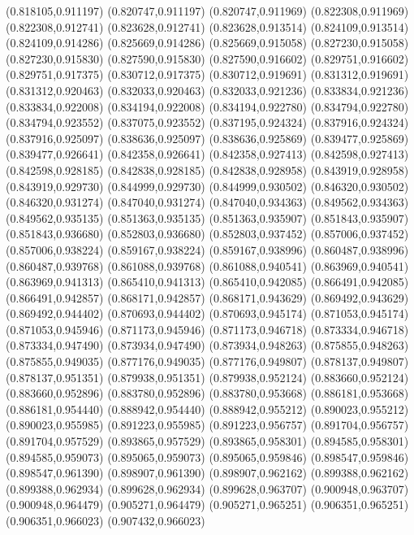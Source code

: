 (0.818105,0.911197)
(0.820747,0.911197)
(0.820747,0.911969)
(0.822308,0.911969)
(0.822308,0.912741)
(0.823628,0.912741)
(0.823628,0.913514)
(0.824109,0.913514)
(0.824109,0.914286)
(0.825669,0.914286)
(0.825669,0.915058)
(0.827230,0.915058)
(0.827230,0.915830)
(0.827590,0.915830)
(0.827590,0.916602)
(0.829751,0.916602)
(0.829751,0.917375)
(0.830712,0.917375)
(0.830712,0.919691)
(0.831312,0.919691)
(0.831312,0.920463)
(0.832033,0.920463)
(0.832033,0.921236)
(0.833834,0.921236)
(0.833834,0.922008)
(0.834194,0.922008)
(0.834194,0.922780)
(0.834794,0.922780)
(0.834794,0.923552)
(0.837075,0.923552)
(0.837195,0.924324)
(0.837916,0.924324)
(0.837916,0.925097)
(0.838636,0.925097)
(0.838636,0.925869)
(0.839477,0.925869)
(0.839477,0.926641)
(0.842358,0.926641)
(0.842358,0.927413)
(0.842598,0.927413)
(0.842598,0.928185)
(0.842838,0.928185)
(0.842838,0.928958)
(0.843919,0.928958)
(0.843919,0.929730)
(0.844999,0.929730)
(0.844999,0.930502)
(0.846320,0.930502)
(0.846320,0.931274)
(0.847040,0.931274)
(0.847040,0.934363)
(0.849562,0.934363)
(0.849562,0.935135)
(0.851363,0.935135)
(0.851363,0.935907)
(0.851843,0.935907)
(0.851843,0.936680)
(0.852803,0.936680)
(0.852803,0.937452)
(0.857006,0.937452)
(0.857006,0.938224)
(0.859167,0.938224)
(0.859167,0.938996)
(0.860487,0.938996)
(0.860487,0.939768)
(0.861088,0.939768)
(0.861088,0.940541)
(0.863969,0.940541)
(0.863969,0.941313)
(0.865410,0.941313)
(0.865410,0.942085)
(0.866491,0.942085)
(0.866491,0.942857)
(0.868171,0.942857)
(0.868171,0.943629)
(0.869492,0.943629)
(0.869492,0.944402)
(0.870693,0.944402)
(0.870693,0.945174)
(0.871053,0.945174)
(0.871053,0.945946)
(0.871173,0.945946)
(0.871173,0.946718)
(0.873334,0.946718)
(0.873334,0.947490)
(0.873934,0.947490)
(0.873934,0.948263)
(0.875855,0.948263)
(0.875855,0.949035)
(0.877176,0.949035)
(0.877176,0.949807)
(0.878137,0.949807)
(0.878137,0.951351)
(0.879938,0.951351)
(0.879938,0.952124)
(0.883660,0.952124)
(0.883660,0.952896)
(0.883780,0.952896)
(0.883780,0.953668)
(0.886181,0.953668)
(0.886181,0.954440)
(0.888942,0.954440)
(0.888942,0.955212)
(0.890023,0.955212)
(0.890023,0.955985)
(0.891223,0.955985)
(0.891223,0.956757)
(0.891704,0.956757)
(0.891704,0.957529)
(0.893865,0.957529)
(0.893865,0.958301)
(0.894585,0.958301)
(0.894585,0.959073)
(0.895065,0.959073)
(0.895065,0.959846)
(0.898547,0.959846)
(0.898547,0.961390)
(0.898907,0.961390)
(0.898907,0.962162)
(0.899388,0.962162)
(0.899388,0.962934)
(0.899628,0.962934)
(0.899628,0.963707)
(0.900948,0.963707)
(0.900948,0.964479)
(0.905271,0.964479)
(0.905271,0.965251)
(0.906351,0.965251)
(0.906351,0.966023)
(0.907432,0.966023)
